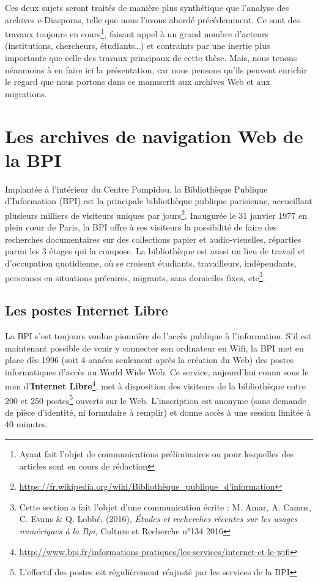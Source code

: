 \documentclass[symmetric,justified,marginals=raggedouter]{tufte-book}
\begin{document}
Ces deux sujets seront traités de manière plus synthétique que l'ana\-lyse des archives e-Diasporas, telle que nous l'avons abordé précédemment. Ce sont des travaux toujours en cours\footnote{\RaggedOuter Ayant fait l'objet de communications préliminaires ou pour lesquelles des articles sont en cours de rédaction}, faisant appel à un grand nombre d'acteurs (institutions, chercheurs, étudiants\ldots{}) et contraints par une inertie plus importante que celle des travaux principaux de cette thèse. Mais, nous tenons néanmoins à en faire ici la présentation, car nous pensons qu'ils peuvent enrichir le regard que nous portons dans ce manuscrit aux archives Web et aux migrations.   

\section{Les archives de navigation Web de la BPI}
\label{sec:7_bpi}

\noindent Implantée à l'intérieur du Centre Pompidou, la Bibliothèque Publique d'Information (BPI) est la principale bibliothèque publique parisienne, accueillant plusieurs milliers de visiteurs uniques par jours\footnote{\RaggedOuter \url{https://fr.wikipedia.org/wiki/Bibliothèque\_publique\_d'information}}. Inaugurée le 31 janvier 1977 en plein cœur de Paris, la BPI offre à ses visiteurs la possibilité de faire des recherches documentaires sur des collections papier et audio-visuelles, réparties parmi les 3 étages qui la compose. La bibliothèque est aussi un lieu de travail et d'occupation quotidienne, où se croisent étudiants, travailleurs, indépendants, personnes en situations précaires, migrants, sans domiciles fixes, etc\footnote{\RaggedOuter Cette section a fait l'objet d'une communication écrite : M. Amar, A. Camus, C. Evans \& Q. Lobbé, (2016), \textit{Études et recherches récentes sur les usages numériques à la Bpi}, Culture et Recherche n°134 2016}.  

\subsection{Les postes Internet Libre}

\noindent La BPI s'est toujours voulue pionnière de l'accès publique à l'informa\-tion. S'il est maintenant possible de venir y connecter son ordinateur en Wifi, la BPI met en place dès 1996 (soit 4 années seulement après la création du Web) des postes informatiques d'accès au World Wide Web. Ce service, aujourd'hui connu sous le nom d'\textbf{Internet Libre}\footnote{\RaggedOuter \url{http://www.bpi.fr/informations-pratiques/les-services/internet-et-le-wifi}}, met à disposition des visiteurs de la bibliothèque entre 200 et 250 postes\footnote{\RaggedOuter L'effectif des postes est régulièrement réajusté par les services de la BPI} ouverts sur le Web. L'inscription est anonyme (sans demande de pièce d'identité, ni formulaire à remplir) et donne accès à une session limitée à 40 minutes.
\end{document}
